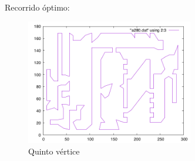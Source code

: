 Recorrido óptimo:

	\begin{figure}[htbH]
		\centering
		\includegraphics[width=0.65\textwidth]{../Viajante/Imagenes/a280_opt.png}
		\caption{Quinto vértice}
	\end{figure}
\newpage